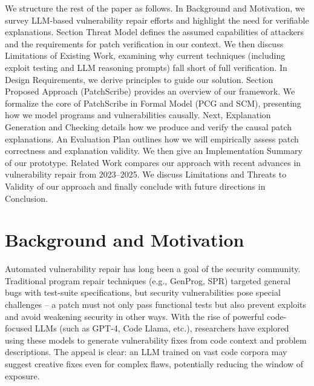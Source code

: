 \documentclass[conference,compsoc]{IEEEtran}
\begin{document}
We structure the rest of the paper as follows. In Background and
Motivation, we survey LLM-based vulnerability repair efforts and
highlight the need for verifiable explanations. Section Threat Model
defines the assumed capabilities of attackers and the requirements for
patch verification in our context. We then discuss Limitations of
Existing Work, examining why current techniques (including exploit
testing and LLM reasoning prompts) fall short of full verification. In
Design Requirements, we derive principles to guide our solution. Section
Proposed Approach (PatchScribe) provides an overview of our framework.
We formalize the core of PatchScribe in Formal Model (PCG and SCM),
presenting how we model programs and vulnerabilities causally. Next,
Explanation Generation and Checking details how we produce and verify
the causal patch explanations. An Evaluation Plan outlines how we will
empirically assess patch correctness and explanation validity. We then
give an Implementation Summary of our prototype. Related Work compares
our approach with recent advances in vulnerability repair from
2023--2025. We discuss Limitations and Threats to Validity of our
approach and finally conclude with future directions in Conclusion.

\section{Background and Motivation}\label{background-and-motivation}

Automated vulnerability repair has long been a goal of the security
community. Traditional program repair techniques (e.g., GenProg, SPR)
targeted general bugs with test-suite specifications, but security
vulnerabilities pose special challenges -- a patch must not only pass
functional tests but also prevent exploits and avoid weakening security
in other ways. With the rise of powerful code-focused LLMs (such as
GPT-4, Code Llama, etc.), researchers have explored using these models
to generate vulnerability fixes from code context and problem
descriptions. The appeal is clear: an LLM trained on vast code corpora
may suggest creative fixes even for complex flaws, potentially reducing
the window of exposure.
\end{document}
